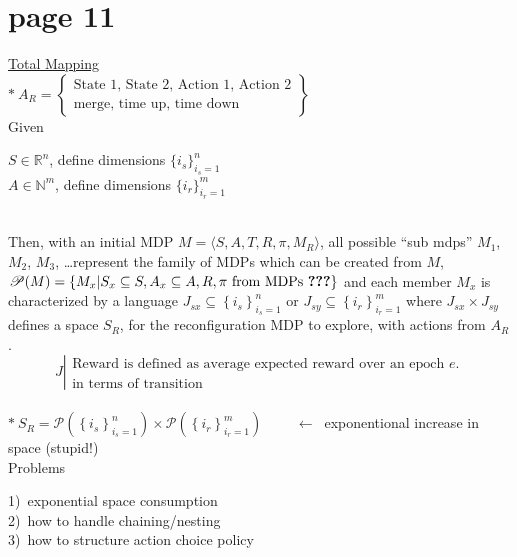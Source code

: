 \section*{page 11}

\underline{Total Mapping}\\

 
$\ast\ A_R = \left\{ \begin{array}{l} \text{State 1, State 2, Action 1, Action 2} \\ \text{merge, time up, time down} \end{array} \right\}$\\

Given\ 
\begin{minipage}[t]{0.7\textwidth}
$S\in\mathbb{R}^{n}$, define dimensions $\{i_s\}_{i_s=1}^{n}$ \\
$A\in \mathbb{N}^{m}$, define dimensions $\{i_r\}_{i_r=1}^{m}$
\end{minipage}\\

Then, with an initial MDP $M=\langle S, A, T, R, \pi, M_R \rangle$, all possible ``sub mdps'' $M_1$, $M_2$, $M_3$, \ldots represent the family of MDPs which can be created from $M$, $\mathscr{P}(M)=\left\{M_x | S_x \subseteq S, A_x\subseteq A, R, \pi \text{\ from MDPs \textbf{???}}\right\}$ and each member $M_x$ is characterized by a language $J_{sx}\subseteq \left\{i_s\right\}_{i_s=1}^{n}$ or $J_{sy}\subseteq\left\{i_r\right\}_{i_r=1}^{m}$ where $J_{sx}\times J_{sy}$ defines a space $S_R$, for the reconfiguration MDP to explore, with actions from $A_R$.\\

\begin{equation*}
J \left| \begin{array}{l}\text{Reward is defined as average expected reward over an epoch $e$.} \\ \text{in terms of transition} \end{array} \right.
\end{equation*}\\

$\ast\ S_R = \mathscr{P}\left(\left\{i_s\right\}_{i_s=1}^{n}\right)\times\mathscr{P}\left(\left\{i_r\right\}_{i_r=1}^{m}\right)$
$\qquad\longleftarrow\ $ exponentional increase in space (stupid!)
\\

Problems\ 
\begin{minipage}[t]{0.5\textwidth}
1)\ exponential space consumption\\
2)\ how to handle chaining/nesting\\
3)\ how to structure action choice policy
\end{minipage}